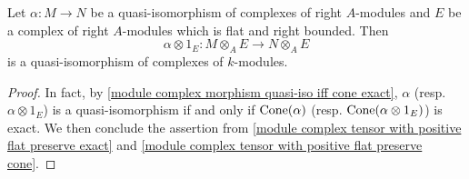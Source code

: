 \begin{proposition}\label{module complex tensor with positive quasi-iso}
Let $\alpha:M\to N$ be a quasi-isomorphism of complexes of right $A$-modules and $E$ be a complex of right $A$-modules which is flat and right bounded. Then
\[\alpha\otimes 1_E:M\otimes_AE\to N\otimes_AE\]
is a quasi-isomorphism of complexes of $k$-modules.
\end{proposition}
\begin{proof}
In fact, by \cref{module complex morphism quasi-iso iff cone exact}, $\alpha$ (resp. $\alpha\otimes 1_E$) is a quasi-isomorphism if and only if $\mathrm{Cone}(\alpha)$ (resp. $\mathrm{Cone}(\alpha\otimes 1_E)$) is exact. We then conclude the assertion from \cref{module complex tensor with positive flat preserve exact} and \cref{module complex tensor with positive flat preserve cone}.
\end{proof}
